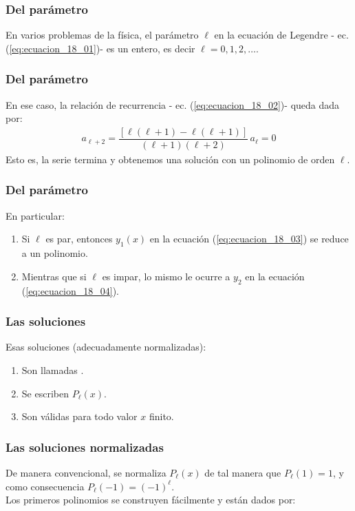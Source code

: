 \documentclass[12pt]{beamer}
\begin{document}
\begin{frame}
\frametitle{Del parámetro}
En varios problemas de la física, el parámetro $\ell$ en la ecuación de Legendre - ec. (\ref{eq:ecuacion_18_01})- es un entero, es decir $\ell = 0, 1, 2, \ldots$.
\end{frame}
\begin{frame}
\frametitle{Del parámetro}
En ese caso, la relación de recurrencia - ec. (\ref{eq:ecuacion_18_02})- queda dada por:
\pause
\begin{align*}
a_{\ell + 2} = \dfrac{[ \ell (\ell + 1) - \ell (\ell + 1) ]}{(\ell + 1)(\ell + 2)}  \, a_{\ell} = 0
\end{align*}
\pause
Esto es, la serie termina y obtenemos una solución con un polinomio de orden $\ell$.
\end{frame}
\begin{frame}
\frametitle{Del parámetro}
En particular:
\begin{enumerate}[<+->]
\item Si $\ell$ es par, entonces $y_{1}(x)$ en la ecuación (\ref{eq:ecuacion_18_03}) se reduce a un polinomio.
\item Mientras que si $\ell$ es impar, lo mismo le ocurre a $y_{2}$ en la ecuación (\ref{eq:ecuacion_18_04}).
\end{enumerate}
\end{frame}
\begin{frame}
\frametitle{Las soluciones}
Esas soluciones (adecuadamente normalizadas):
\begin{enumerate}[<+->]
\item Son llamadas .
\item Se escriben $P_{\ell} (x)$.
\item Son válidas para todo valor $x$ finito.
\end{enumerate}
\end{frame}
\begin{frame}
\frametitle{Las soluciones normalizadas}
De manera convencional, se normaliza $P_{\ell} (x)$ de tal manera que $P_{\ell}(1) =  1$, \pause y como consecuencia $P_{\ell}(-1) = (-1)^{\ell}$.
\\
\bigskip
\pause
Los primeros polinomios se construyen fácilmente y están dados por:
\end{frame}
\end{document}
